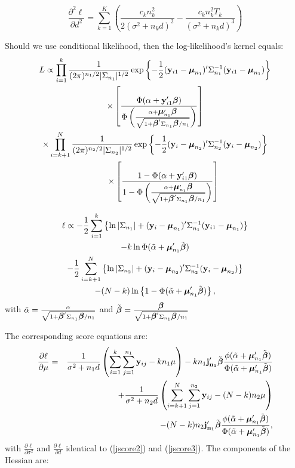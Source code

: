 \documentclass[11pt,a5paper,twoside]{book}
\newcommand{\by}{{\bf y}}
\newcommand{\bfbeta}{\mbox{\boldmath $\beta$}}
\newcommand{\bmu}{\mbox{\boldmath $\mu$}}
\begin{document}
{\begin{equation}
\frac{\partial^2\ell}{\partial d^2} = \sum_{k=1}^K \left(\frac{c_kn_k^2}{2(\sigma^2+n_kd)^2}-\frac{c_kn_k^2T_k}{(\sigma^2+n_kd)^3} \right) \label{jhessian9} 
\end{equation}






Should we use conditional likelihood, then the log-likelihood's kernel equals:
\begin{multline}
L  \propto \prod^k_{i=1} \frac{1}{(2\pi)^{n_1/2}|\Sigma_{n_1}|^{1/2}} \exp \left\{ -\frac{1}{2}(\by_{i1}-\bmu_{n_1})'\Sigma_{n_1}^{-1} (\by_{i1}-\bmu_{n_1}) \right\}  \\
\times \left[ \frac{\Phi (\alpha + \by'_{i1} \bfbeta)}{\Phi\left( \frac{\alpha + \bmu_{n_1}'\bfbeta}{\sqrt{1+\bfbeta'\Sigma_{n_1}\bfbeta/n_1}} \right)} \right] \\
\times \prod^N_{i=k+1} \frac{1}{(2\pi)^{n_2/2}|\Sigma_{n_2}|^{1/2}}\exp \left\{ -\frac{1}{2}(\by_i-\bmu_{n_2})'\Sigma_{n_2}^{-1} (\by_i-\bmu_{n_2}) \right\} \\
\qquad\times\left[ \frac{1-\Phi (\alpha + \by'_{i1} \bfbeta)}{1-\Phi\left( \frac{\alpha + \bmu_{n_1}'\bfbeta}{\sqrt{1+\bfbeta'\Sigma_{n_1}\bfbeta/n_1}} \right)} \right] \label{clik} 
\end{multline}

\begin{multline}
\ell  \propto - \frac{1}{2} \sum_{i=1}^k \left\{ \ln|\Sigma_{n_1}| + (\by_{i}-\bmu_{n_1})'\Sigma_{n_1}^{-1} (\by_{i1}-\bmu_{n_1}) \right\}  \\
 - k \ln \Phi(\tilde{\alpha} + \bmu_{n_1}'\tilde{\bfbeta})  \\
 -\frac{1}{2} \sum_{i=k+1}^N \left\{ \ln|\Sigma_{n_2}| + (\by_i-\bmu_{n_2})'\Sigma_{n_2}^{-1} (\by_i-\bmu_{n_2}) \right\}\\
 -(N-k) \ln \left\{1-\Phi(\tilde{\alpha} + \bmu_{n_1}' \tilde{\bfbeta})\right\},  \label{cloglik} 
\end{multline}
with $\tilde{\alpha}=\frac{\alpha}{\sqrt{1+\bfbeta'\Sigma_{n_1}\bfbeta/n_1}}$ and  $\tilde{\bfbeta}=\frac{\bfbeta}{\sqrt{1+\bfbeta'\Sigma_{n_1}\bfbeta/n_1}}$

The corresponding score equations are:
\begin{equation}
\begin{aligned}
\frac{\partial\ell}{\partial \mu} & =&\frac{1}{\sigma^2+n_1d} \left( \sum_{i=1}^k \sum_{j=1}^{n_1} \by_{ij}-k n_1 \mu\right)
 - k n_1 \mathbf{j_{n_1}'} \tilde{\bfbeta} \frac{\phi(\tilde{\alpha}+\bmu_{n_1}'\tilde{\bfbeta})}{\Phi(\tilde{\alpha}+\bmu_{n_1}'\tilde{\bfbeta})}  \\
&& + \frac{1}{\sigma^2+n_2d} \left( \sum_{i=k+1}^N \sum_{j=1}^{n_2} \by_{ij}-(N-k) n_2 \mu\right) \\
 &&- (N-k) n_2 \mathbf{j_{n_1}'} \tilde{\bfbeta} \frac{\phi(\tilde{\alpha}+\bmu_{n_1}'\tilde{\bfbeta})}{\Phi(\tilde{\alpha}+\bmu_{n_1}'\tilde{\bfbeta})} \label{cscore1} ,
\end{aligned}
\end{equation}
with $\frac{\partial\ell}{\partial \sigma^2}$ and $\frac{\partial\ell}{\partial d}$ identical to (\ref{jscore2}) and (\ref{jscore3}). The components of the Hessian are:


}
\end{document}
